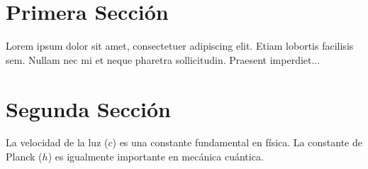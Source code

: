 \documentclass{article}
\begin{document}
	\tableofcontents
	
	\section{Primera Sección}
	
	Lorem ipsum dolor sit amet, consectetuer adipiscing elit. Etiam lobortis facilisis sem. 
	Nullam nec mi et neque pharetra sollicitudin. Praesent imperdiet...
	
	
	\section{Segunda Sección}
	
	La velocidad de la luz ($c$) es una constante fundamental en física. 
	La constante de Planck ($h$) es igualmente importante en mecánica cuántica.
	
	
	\clearpage
	
	\printnomenclature
	
\end{document}
